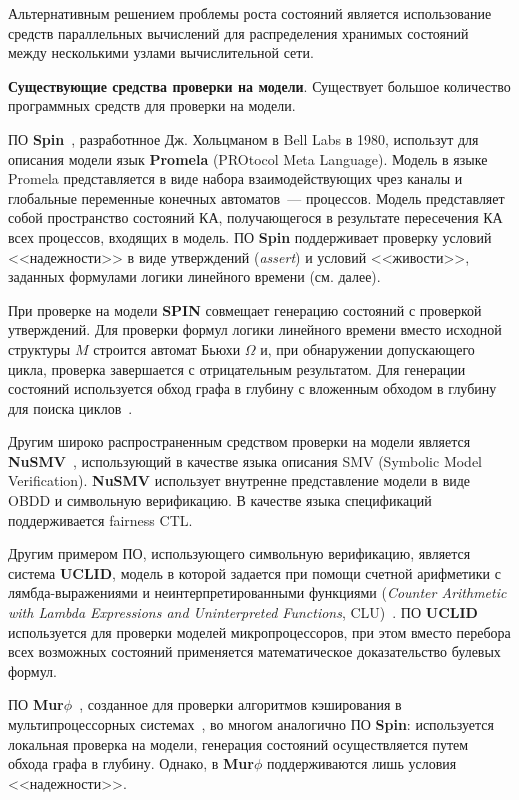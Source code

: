 \documentclass[a4paper,notitlepage,14pt]{article}
\begin{document}
Альтернативным решением проблемы роста состояний является использование средств
параллельных вычислений для распределения хранимых состояний между несколькими узлами
вычислительной сети.


\textbf{Существующие средства проверки на модели}. Существует большое количество
программных средств для проверки на модели.

ПО \textbf{Spin}~\cite{SpinRoot}, разработнное Дж. Хольцманом в Bell Labs в 1980,
использут для описания модели язык \textbf{Promela} (PROtocol Meta Language). Модель в
языке Promela представляется в виде набора взаимодействующих чрез каналы и глобальные
переменные конечных автоматов~--- процессов. Модель представляет собой пространство
состояний КА, получающегося в результате пересечения КА всех процессов, входящих в
модель. ПО \textbf{Spin} поддерживает проверку условий <<надежности>> в виде утверждений
(\emph{assert}) и условий <<живости>>, заданных формулами логики линейного времени
(см. далее).

При проверке на модели \textbf{SPIN} совмещает генерацию состояний с проверкой
утверждений. Для проверки формул логики линейного времени вместо исходной структуры $M$
строится автомат Бьюхи $\Omega$ и, при обнаружении допускающего цикла, проверка
завершается с отрицательным результатом. Для генерации состояний используется обход графа
в глубину с вложенным обходом в глубину для поиска циклов~\cite{DBLP:conf/spin/FaragoS09}.

Другим широко распространенным средством проверки на модели является
\textbf{NuSMV}~\cite{Cimatti00nusmv:a}, использующий в качестве языка описания SMV
(Symbolic Model Verification). \textbf{NuSMV} использует внутренне представление модели в
виде OBDD и символьную верификацию. В качестве языка спецификаций поддерживается fairness
CTL.

Другим примером ПО, использующего символьную верификацию, является система \textbf{UCLID},
модель в которой задается при помощи счетной арифметики с лямбда-выражениями и
неинтерпретированными функциями (\emph{Counter Arithmetic with Lambda Expressions and
  Uninterpreted Functions}, CLU)~\cite{Lahiri02modelingand}. ПО \textbf{UCLID}
используется для проверки моделей микропроцессоров, при этом вместо перебора всех
возможных состояний применяется математическое доказательство булевых формул.

ПО \textbf{Mur$\phi$}~\cite{Dill96murphi}, созданное для проверки алгоритмов кэширования в
мультипроцессорных системах~\cite{Dill96murphi}, во многом аналогично ПО \textbf{Spin}:
используется локальная проверка на модели, генерация состояний осуществляется путем обхода
графа в глубину. Однако, в \textbf{Mur$\phi$} поддерживаются лишь условия <<надежности>>.
\end{document}
